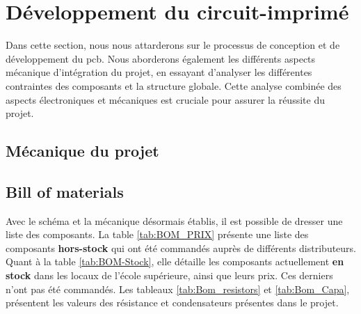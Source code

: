\section{Développement du circuit-imprimé} \label{sec:Dev-PCB}
Dans cette section, nous nous attarderons sur le processus de conception et de développement du \gls{pcb}. Nous aborderons également les différents aspects mécanique d'intégration du projet, en essayant d'analyser les différentes contraintes des composants et la structure globale. Cette analyse combinée des aspects électroniques et mécaniques est cruciale pour assurer la réussite du projet.

\clearpage

\subsection{Mécanique du projet} \label{ssec:mechProjet}


\clearpage

\subsection{Bill of materials} \label{ssec:BOM}
Avec le schéma et la mécanique désormais établis, il est possible de dresser une liste des composants. La table \ref{tab:BOM_PRIX} présente une liste des composants \textbf{hors-stock} qui ont été commandés auprès de différents distributeurs. Quant à la table \ref{tab:BOM-Stock}, elle détaille les composants actuellement \textbf{en stock} dans les locaux de l'école supérieure, ainsi que leurs prix. Ces derniers n'ont pas été commandés. Les tableaux \ref{tab:Bom_resistors} et \ref{tab:Bom_Capa}, présentent les valeurs des résistance et condensateurs présentes dans le projet.

